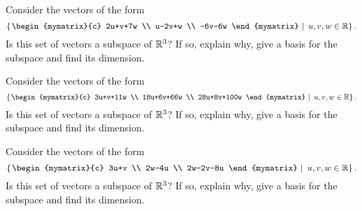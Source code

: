 \begin{enumialphparenastyle}
\begin{ex}
  Consider the vectors of the form 
  \begin{equation*}
    \set{\left.\begin{mymatrix}{c}
        2u+v+7w \\ 
        u-2v+w \\ 
        -6v-6w
      \end{mymatrix} ~\right\vert~u,v,w\in \R} .
  \end{equation*}
  Is this set of vectors a subspace of $\mathbb{R}^{3}$? If so, explain why,
  give a basis for the subspace and find its dimension.
\end{ex}

\begin{ex}
  Consider the vectors of the form 
  \begin{equation*}
    \set{\left.\begin{mymatrix}{c}
        3u+v+11w \\ 
        18u+6v+66w \\ 
        28u+8v+100w
      \end{mymatrix} ~\right\vert~u,v,w\in \R} .
  \end{equation*}
  Is this set of vectors a subspace of $\mathbb{R}^{3}$? If so, explain why,
  give a basis for the subspace and find its dimension.
\end{ex}

\begin{ex}
  Consider the vectors of the form 
  \begin{equation*}
    \set{\left.\begin{mymatrix}{c}
        3u+v \\ 
        2w-4u \\ 
        2w-2v-8u
      \end{mymatrix} ~\right\vert~u,v,w\in \R} .
  \end{equation*}
  Is this set of vectors a subspace of $\mathbb{R}^{3}$? If so, explain why,
  give a basis for the subspace and find its dimension.
\end{ex}


\end{enumialphparenastyle}
